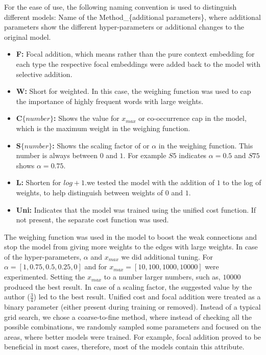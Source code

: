 For the ease of use, the following naming convention is used to distinguish different models: Name of the Method\_\{additional parameters\}, where additional parameters show the different hyper-parameters or additional changes to the original model. 
\begin{itemize}
\item  \textbf{F:} Focal addition, which means rather than the pure context embedding for each type the respective focal embeddings were added back to the model with selective addition. 
\item \textbf{W:} Short for weighted. In this case, the weighing function was used to cap the importance of highly frequent words with large weights. 
\item \textbf{C$\{ number \}$:} Shows the value for $x_{max}$ or co-occurrence cap in the model, which is the maximum weight in the weighing function. 
\item \textbf{S$\{ number \}$:} Shows the scaling factor of or $\alpha$ in the weighing function. This number is always between $0$ and $1$. For example $S5$ indicates $\alpha=0.5$ and $S75 $ shows $\alpha=0.75$. 
\item \textbf{L:} Shorten for $log+1$.we tested the model with the addition of $1$ to the log of weights, to help distinguish between weights of $0$ and $1$. 

\item \textbf{Uni:} Indicates that the model was trained using the unified cost function. If not present, the separate cost function was used. 
\end{itemize}

The weighing function was used in the model to boost the weak connections and stop the model from giving more weights to the edges with large weights. In case of the hyper-parameters, $\alpha$ and $x_{max}$ we did additional tuning. For $\alpha=[1,0.75,0.5,0.25,0]$ and for $x_{max}=[10,100,1000,10000]$ were experimented. Setting the $x_{max}$ to a number larger numbers, such as, $10000$ produced the best result. In case of a scaling factor, the suggested value by the author ($\frac{3}{4}$) led to the best result. 
Unified cost and focal addition were treated as a binary parameter (either present during training or removed). Instead of a typical grid search, we chose a coarse-to-fine method, where instead of checking all the possible combinations, we randomly sampled some parameters and focused on the areas, where better models were trained. For example, focal addition proved to be beneficial in most cases, therefore, most of the models contain this attribute.\\

